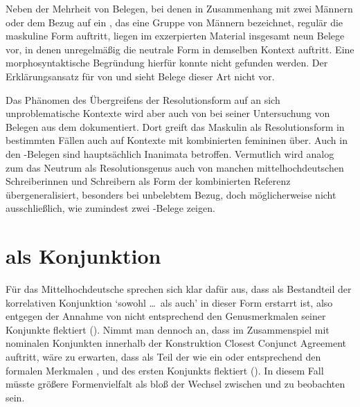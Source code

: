 Neben der Mehrheit von Belegen, bei denen in Zusammenhang mit zwei Männern oder
dem Bezug auf ein , das eine Gruppe von Männern bezeichnet,
regulär die maskuline Form  auftritt, liegen im exzerpierten
Material insgesamt neun Belege vor, in denen unregelmäßig die
neutrale Form  in demselben Kontext auftritt. Eine
morphosyntaktische Begründung hierfür konnte nicht gefunden werden. Der
Erklärungsansatz für  von \citet{wechslerzlatic2003} und
\citet{wechsler2009} sieht Belege dieser Art nicht vor.

Das Phänomen des Übergreifens der Resolutionsform auf an sich unproblematische
Kontexte wird aber auch von \citet[302]{corbett1991} bei seiner Untersuchung
von Belegen aus dem  dokumentiert. Dort greift das Maskulin als
Resolutionsform in bestimmten Fällen auch auf Kon\-texte mit kombinierten
femininen  über. Auch in den \CAO{}-Belegen sind hauptsächlich
Inanimata betroffen. Vermutlich wird analog zum  das Neutrum als
Resolutionsgenus auch von manchen
mittelhochdeutschen Schreiberinnen und Schreibern als
Form der kombinierten Referenz übergeneralisiert,
besonders bei unbelebtem Bezug, doch möglicherweise nicht ausschließlich, wie
zumindest zwei \KC-Belege zeigen.


\section{ als Konjunktion}
\label{sec:beideconj}

Für das Mittelhochdeutsche sprechen sich
\citet[626--627]{ksw2} klar dafür aus, dass  als Bestandteil der
korrelativen Konjunktion  `sowohl \dots\ als auch' in
dieser Form erstarrt ist, also  entgegen der Annahme von
\citet{askedal1974} nicht entsprechend den Genusmerkmalen
seiner Konjunkte flektiert (). Nimmt man dennoch an,
dass im Zusammenspiel mit nominalen Konjunkten innerhalb der Konstruktion
Closest Conjunct Agreement auftritt, wäre zu
erwarten, dass  als Teil der  wie ein
 oder  entsprechend den formalen
Merkmalen ,  und 
des ersten Konjunkts flektiert (). In diesem Fall müsste
größere Formenvielfalt als bloß der Wechsel zwischen  und
 zu beobachten sein.

